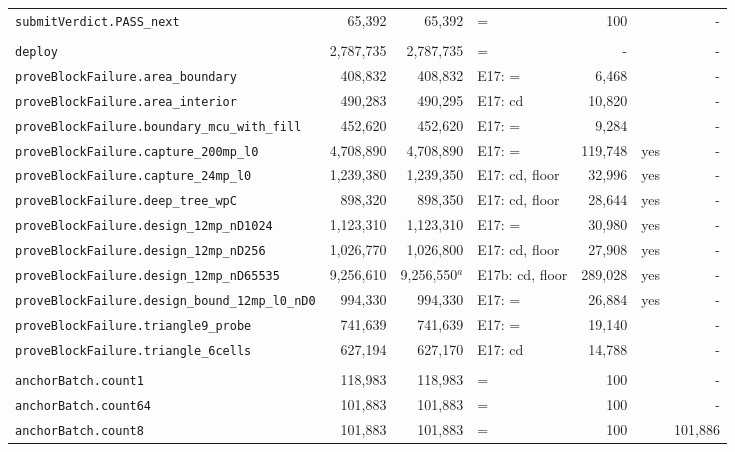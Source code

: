 \documentclass[10pt]{article}
\begin{document}
{\begin{longtable}{@{}lrrlrcr@{}}
\quad\texttt{submitVerdict.PASS\_next} & 65{,}392 & 65{,}392 & = & 100 &  & - \\
\addlinespace[3pt]
\multicolumn{7}{@{}l}{\textbf{\texttt{BlockCourt}}}\\
\quad\texttt{deploy} & 2{,}787{,}735 & 2{,}787{,}735 & = & - &  & - \\
\quad\texttt{proveBlockFailure.area\_boundary} & 408{,}832 & 408{,}832 & E17: = & 6{,}468 &  & - \\
\quad\texttt{proveBlockFailure.area\_interior} & 490{,}283 & 490{,}295 & E17: cd & 10{,}820 &  & - \\
\quad\texttt{proveBlockFailure.boundary\_mcu\_with\_fill} & 452{,}620 & 452{,}620 & E17: = & 9{,}284 &  & - \\
\quad\texttt{proveBlockFailure.capture\_200mp\_l0} & 4{,}708{,}890 & 4{,}708{,}890 & E17: = & 119{,}748 & yes & - \\
\quad\texttt{proveBlockFailure.capture\_24mp\_l0} & 1{,}239{,}380 & 1{,}239{,}350 & E17: cd, floor & 32{,}996 & yes & - \\
\quad\texttt{proveBlockFailure.deep\_tree\_wpC} & 898{,}320 & 898{,}350 & E17: cd, floor & 28{,}644 & yes & - \\
\quad\texttt{proveBlockFailure.design\_12mp\_nD1024} & 1{,}123{,}310 & 1{,}123{,}310 & E17: = & 30{,}980 & yes & - \\
\quad\texttt{proveBlockFailure.design\_12mp\_nD256} & 1{,}026{,}770 & 1{,}026{,}800 & E17: cd, floor & 27{,}908 & yes & - \\
\quad\texttt{proveBlockFailure.design\_12mp\_nD65535} & 9{,}256{,}610 & 9{,}256{,}550$^{a}$ & E17b: cd, floor & 289{,}028 & yes & - \\
\quad\texttt{proveBlockFailure.design\_bound\_12mp\_l0\_nD0} & 994{,}330 & 994{,}330 & E17: = & 26{,}884 & yes & - \\
\quad\texttt{proveBlockFailure.triangle9\_probe} & 741{,}639 & 741{,}639 & E17: = & 19{,}140 &  & - \\
\quad\texttt{proveBlockFailure.triangle\_6cells} & 627{,}194 & 627{,}170 & E17: cd & 14{,}788 &  & - \\
\addlinespace[3pt]
\multicolumn{7}{@{}l}{\textbf{\texttt{CaptureAnchor}}}\\
\quad\texttt{anchorBatch.count1} & 118{,}983 & 118{,}983 & = & 100 &  & - \\
\quad\texttt{anchorBatch.count64} & 101{,}883 & 101{,}883 & = & 100 &  & - \\
\quad\texttt{anchorBatch.count8} & 101{,}883 & 101{,}883 & = & 100 &  & 101{,}886 \\

\end{longtable}}
\end{document}
